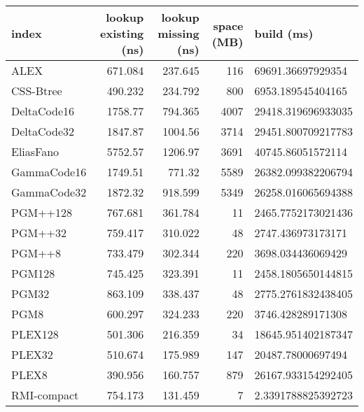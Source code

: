 \begin{tabular}{lrrrl}
\hline
 index             &   lookup existing (ns) &   lookup missing (ns) &   space (MB) & build (ms)         \\
\hline
 ALEX              &                671.084 &               237.645 &          116 & 69691.36697929354  \\
 CSS-Btree         &                490.232 &               234.792 &          800 & 6953.189545404165  \\
 DeltaCode16       &               1758.77  &               794.365 &         4007 & 29418.319696933035 \\
 DeltaCode32       &               1847.87  &              1004.56  &         3714 & 29451.800709217783 \\
 EliasFano         &               5752.57  &              1206.97  &         3691 & 40745.86051572114  \\
 GammaCode16       &               1749.51  &               771.32  &         5589 & 26382.099382206794 \\
 GammaCode32       &               1872.32  &               918.599 &         5349 & 26258.016065694388 \\
 PGM++128          &                767.681 &               361.784 &           11 & 2465.7752173021436 \\
 PGM++32           &                759.417 &               310.022 &           48 & 2747.436973173171  \\
 PGM++8            &                733.479 &               302.344 &          220 & 3698.034436069429  \\
 PGM128            &                745.425 &               323.391 &           11 & 2458.1805650144815 \\
 PGM32             &                863.109 &               338.437 &           48 & 2775.2761832438405 \\
 PGM8              &                600.297 &               324.233 &          220 & 3746.428289171308  \\
 PLEX128           &                501.306 &               216.359 &           34 & 18645.951402187347 \\
 PLEX32            &                510.674 &               175.989 &          147 & 20487.78000697494  \\
 PLEX8             &                390.956 &               160.757 &          879 & 26167.933154292405 \\
 RMI-compact       &                754.173 &               131.459 &            7 & 2.3391788825392723 \\

\end{tabular}
